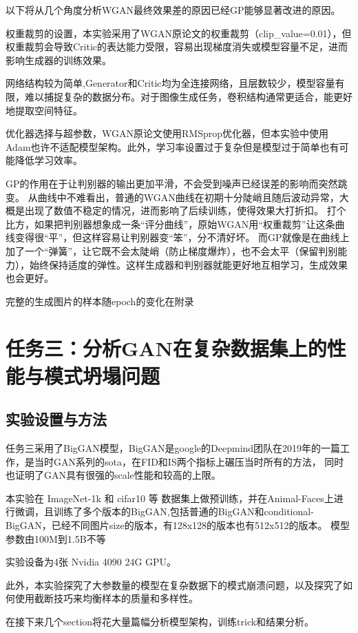 \documentclass[12pt, a4paper]{article}
\begin{document}
以下将从几个角度分析WGAN最终效果差的原因已经GP能够显著改进的原因。

权重裁剪的设置，本实验采用了WGAN原论文的权重裁剪（clip\_value=0.01），但权重裁剪会导致Critic的表达能力受限，容易出现梯度消失或模型容量不足，进而影响生成器的训练效果。

网络结构较为简单,Generator和Critic均为全连接网络，且层数较少，模型容量有限，难以捕捉复杂的数据分布。对于图像生成任务，卷积结构通常更适合，能更好地提取空间特征。

优化器选择与超参数，WGAN原论文使用RMSprop优化器，但本实验中使用Adam也许不适配模型架构。此外，学习率设置过于复杂但是模型过于简单也有可能降低学习效率。

GP的作用在于让判别器的输出更加平滑，不会受到噪声已经误差的影响而突然跳变。
从曲线中不难看出，普通的WGAN曲线在初期十分陡峭且随后波动异常，大概是出现了数值不稳定的情况，进而影响了后续训练，使得效果大打折扣。
打个比方，如果把判别器想象成一条“评分曲线”，原始WGAN用“权重裁剪”让这条曲线变得很“平”，但这样容易让判别器变“笨”，分不清好坏。
而GP就像是在曲线上加了一个“弹簧”，让它既不会太陡峭（防止梯度爆炸），也不会太平（保留判别能力），始终保持适度的弹性。这样生成器和判别器就能更好地互相学习，生成效果也会更好。


\vspace{1cm}
完整的生成图片的样本随epoch的变化在附录


\newpage
\section{任务三：分析GAN在复杂数据集上的性能与模式坍塌问题}
\subsection{实验设置与方法}
任务三采用了BigGAN模型，BigGAN是google的Deepmind团队在2019年的一篇工作，是当时GAN系列的sota，在FID和IS两个指标上碾压当时所有的方法，
同时也证明了GAN具有很强的scale性能和较高的上限。

本实验在 ImageNet-1k 和 cifar10 等 数据集上做预训练，并在Animal-Faces上进行微调，且训练了多个版本的BigGAN,包括普通的BigGAN和conditional-BigGAN，已经不同图片size的版本，有128x128的版本也有512x512的版本。
模型参数由100M到1.5B不等

实验设备为4张 Nvidia 4090 24G GPU。

此外，本实验探究了大参数量的模型在复杂数据下的模式崩溃问题，以及探究了如何使用截断技巧来均衡样本的质量和多样性。

在接下来几个section将花大量篇幅分析模型架构，训练trick和结果分析。
\end{document}
